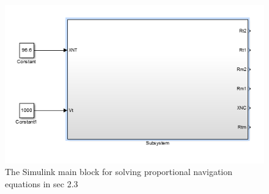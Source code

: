 \begin{figure}[H]
	\centering
	\includegraphics[scale = 0.75]{fig/PNmainBlock.PNG}
	\caption{The Simulink main block for solving proportional navigation equations in sec 2.3}
	\label{PN main block}
\end{figure}







